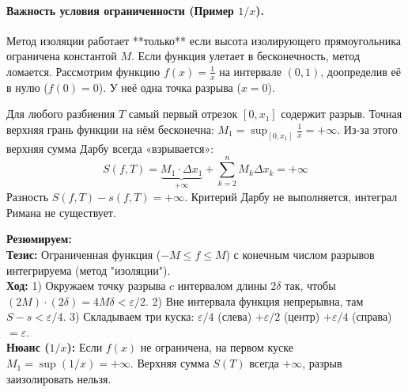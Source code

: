 \paragraph{Важность условия ограниченности (Пример $1/x$).}
Метод изоляции работает **только** если высота изолирующего прямоугольника ограничена константой $M$. Если функция улетает в бесконечность, метод ломается.
Рассмотрим функцию $f(x) = \frac{1}{x}$ на интервале $(0, 1)$, доопределив её в нулю ($f(0) = 0$). У неё одна точка разрыва ($x = 0$).

Для любого разбиения $T$ самый первый отрезок $[0, x_1]$ содержит разрыв. Точная верхняя грань функции на нём бесконечна: $M_1 = \sup_{[0, x_1]} \frac{1}{x} = +\infty$.
Из-за этого верхняя сумма Дарбу всегда «взрывается»:
$$ S(f, T) = \underbrace{M_1 \cdot \Delta x_1}_{+\infty} + \sum_{k=2}^n M_k \Delta x_k = +\infty $$
Разность $S(f,T) - s(f,T) = +\infty$. Критерий Дарбу не выполняется, интеграл Римана не существует.

\vspace{0.5em}
\begin{center}
\end{center}
\vspace{0.5em}


\begin{tcolorbox}[colback=gray!5, colframe=black, boxrule=0.5pt, arc=0pt]
\textbf{Резюмируем:} \\
\textbf{Тезис:} Ограниченная функция ($-M \le f \le M$) с конечным числом разрывов интегрируема (метод "изоляции"). \\
\textbf{Ход:} 1) Окружаем точку разрыва $c$ интервалом длины $2\delta$ так, чтобы $(2M)\cdot(2\delta) = 4M\delta < \varepsilon/2$. 2) Вне интервала функция непрерывна, там $S-s < \varepsilon/4$. 3) Складываем три куска: $\varepsilon/4$ (слева) $+ \varepsilon/2$ (центр) $+ \varepsilon/4$ (справа) $= \varepsilon$. \\
\textbf{Нюанс ($1/x$):} Если $f(x)$ не ограничена, на первом куске $M_1 = \sup (1/x) = +\infty$. Верхняя сумма $S(T)$ всегда $+\infty$, разрыв заизолировать нельзя.
\end{tcolorbox}